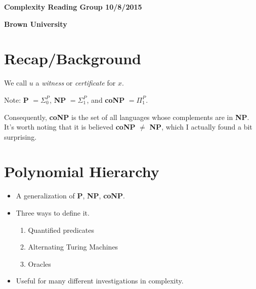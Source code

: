 \documentclass[11pt]{article} %
\begin{document}
\centerline{\LARGE{\bf Complexity Reading Group 10/8/2015}}
\vspace{2mm}
\centerline{\Large {\bf Brown University}}

\section{Recap/Background}


We call $u$ a {\it witness} or {\it certificate} for $x$.

Note: {\bf P} $= \Sigma_0^P$, {\bf NP} $= \Sigma_1^P$, and {\bf coNP} $= \Pi_1^P$.

Consequently, {\bf coNP} is the set of all languages whose complements are in {\bf NP}. It's worth noting that it is believed {\bf coNP} $\neq$ {\bf NP}, which I actually found a bit surprising.

\section{Polynomial Hierarchy}

\begin{itemize}
\item A generalization of {\bf P}, {\bf NP}, {\bf coNP}.
\item Three ways to define it.
\begin{enumerate}
\item Quantified predicates
\item Alternating Turing Machines
\item Oracles
\end{enumerate}
\item Useful for many different investigations in complexity.
\end{itemize}
\end{document}
